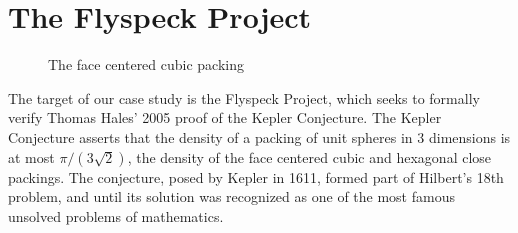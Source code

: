 \section{The Flyspeck Project}
\label{sec:flyspeck}

\begin{figure}
  \centering
  \vspace{-.95cm}
  \vspace{-1.0cm}
  \caption{The face centered cubic packing}
  \vspace{-1.0cm}
\end{figure}

The target of our case study is the Flyspeck Project, which seeks to
formally verify Thomas Hales' 2005 proof of the Kepler Conjecture.
The Kepler Conjecture asserts that the density of a packing of unit
spheres in 3 dimensions is at most $\pi/(3\sqrt{2})$, the density of the face centered
cubic and hexagonal close packings.  The conjecture, posed by Kepler
in 1611, formed part of Hilbert's 18th problem, and until its solution
was recognized as one of the most famous unsolved problems of
mathematics.

